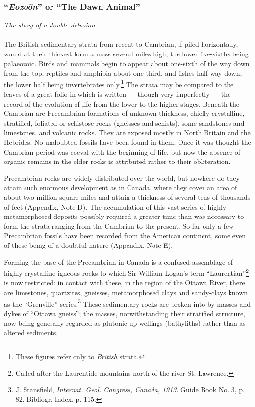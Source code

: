 \documentclass[a4paper, 12pt, oneside]{article}
\begin{document}
\subsubsection{``\emph{Eozoön}'' or ``The Dawn Animal''}
\centerline{\emph{The story of a double delusion.}}
\paragraph{}
The British sedimentary strata from recent to Cambrian, if piled horizontally, would at their thickest form a mass several miles high, the lower five-sixths being palaeozoic. Birds and mammals begin to appear about one-sixth of the way down from the top, reptiles and amphibia about one-third, and fishes half-way down, the lower half being invertebrates only.\footnote{These figures refer only to \emph{British} strata.} The strata may be compared to the leaves of a great folio in which is written --- though very imperfectly --- the record of the evolution of life from the lower to the higher stages. Beneath the Cambrian are Precambrian formations of unknown thickness, chiefly crystalline, stratified, foliated or schistose rocks (gneisses and schists), some sandstones and limestones, and volcanic rocks. They are exposed mostly in North Britain and the Hebrides. No undoubted fossils have been found in them. Once it was thought the Cambrian period was coeval with the beginning of life, but now the absence of organic remains in the older rocks is attributed rather to their obliteration.

Precambrian rocks are widely distributed over the world, but nowhere do they attain such enormous development as in Canada, where they cover an area of about two million square miles and attain a thickness of several tens of thousands of feet (Appendix, Note D). The accumulation of this vast series of highly metamorphosed deposits possibly required a greater time than was necessary to form the strata ranging from the Cambrian to the present. So far only a few Precambrian fossils have been recorded from the American continent, some even of these being of a doubtful nature (Appendix, Note E).

Forming the base of the Precambrian in Canada is a confused assemblage of highly crystalline igneous rocks to which Sir William Logan's term ``Laurentian''\footnote{Called after the Laurentide mountains north of the river St. Lawrence.} is now restricted: in contact with these, in the region of the Ottawa River, there are limestones, quartzites, gneisses, metamorphosed clays and sandy-clays known as the ``Grenville'' series.\footnote{J. Stansfield, \emph{Internat. Geol. Congress, Canada, 1913}. Guide Book No. 3, p. 82. Bibliogr. Index, p. 115.} These sedimentary rocks are broken into by masses and dykes of ``Ottawa gneiss''; the masses, notwithstanding their stratified structure, now being generally regarded as plutonic up-wellings (bathyliths) rather than as altered sediments.
\end{document}
